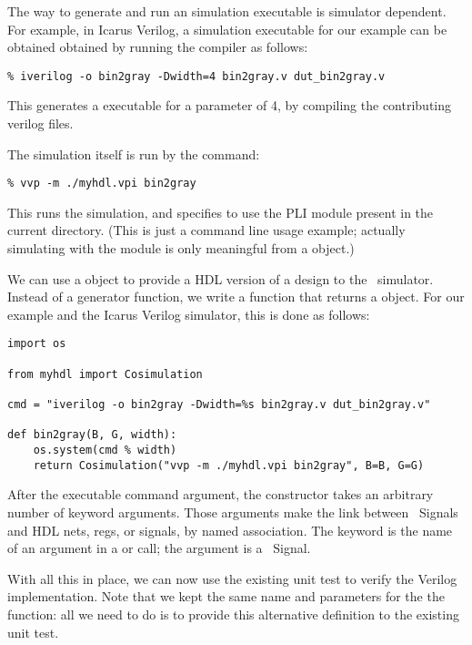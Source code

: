 The way to generate and run an simulation executable is simulator
dependent.  For example, in Icarus Verilog, a simulation executable
for our example can be obtained obtained by running the
 compiler as follows:

\begin{verbatim}
% iverilog -o bin2gray -Dwidth=4 bin2gray.v dut_bin2gray.v

\end{verbatim}

This generates a  executable for a parameter 
of 4, by compiling the contributing verilog files.

The simulation itself is run by the  command:

\begin{verbatim}
% vvp -m ./myhdl.vpi bin2gray

\end{verbatim}

This runs the  simulation, and specifies to use the
 PLI module present in the current directory. (This is 
just a command line usage example; actually simulating with the
 module is only meaningful from a
 object.)

We can use a  object to provide a HDL
version of a design to the \myhdl\ simulator. Instead of a generator
function, we write a function that returns a 
object. For our example and the Icarus Verilog simulator, this is done
as follows:

\begin{verbatim}
import os

from myhdl import Cosimulation

cmd = "iverilog -o bin2gray -Dwidth=%s bin2gray.v dut_bin2gray.v"
      
def bin2gray(B, G, width):
    os.system(cmd % width)
    return Cosimulation("vvp -m ./myhdl.vpi bin2gray", B=B, G=G)

\end{verbatim}

After the executable command argument, the 
constructor takes an arbitrary number of keyword arguments. Those
arguments make the link between \myhdl\ Signals and HDL nets, regs, or
signals, by named association. The keyword is the name of an argument
in a  or  call; the argument is
a \myhdl\ Signal.

With all this in place, we can now use the existing unit test
to verify the Verilog implementation. Note that we kept the
same name and parameters for the the  function:
all we need to do is to provide this alternative definition
to the existing unit test.

